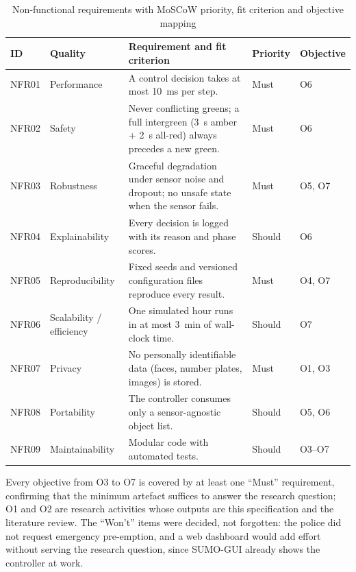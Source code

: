 \begin{table}[htbp]
\centering
\caption[Non-functional requirements with MoSCoW priority]{Non-functional requirements with MoSCoW priority, fit criterion and objective mapping}
\label{tab:srs-nfr}
\small
\renewcommand{\arraystretch}{1.1}
\begin{tabularx}{\textwidth}{@{}p{1.2cm}>{\raggedright\arraybackslash}p{2.5cm}>{\raggedright\arraybackslash}Xp{1.3cm}p{1.65cm}@{}}
\toprule
\textbf{ID} & \textbf{Quality} & \textbf{Requirement and fit criterion} & \textbf{Priority} & \textbf{Objective}\\
\midrule
NFR01 & Performance & A control decision takes at most 10~ms per step. & Must & O6\\
NFR02 & Safety & Never conflicting greens; a full intergreen (3~s amber + 2~s all-red) always precedes a new green. & Must & O6\\
NFR03 & Robustness & Graceful degradation under sensor noise and dropout; no unsafe state when the sensor fails. & Must & O5, O7\\
NFR04 & Explainability & Every decision is logged with its reason and phase scores. & Should & O6\\
NFR05 & Reproducibility & Fixed seeds and versioned configuration files reproduce every result. & Must & O4, O7\\
NFR06 & Scalability / efficiency & One simulated hour runs in at most 3~min of wall-clock time. & Should & O7\\
NFR07 & Privacy & No personally identifiable data (faces, number plates, images) is stored. & Must & O1, O3\\
NFR08 & Portability & The controller consumes only a sensor-agnostic object list. & Should & O5, O6\\
NFR09 & Maintainability & Modular code with automated tests. & Should & O3--O7\\
\bottomrule
\end{tabularx}
\end{table}

Every objective from O3 to O7 is covered by at least one ``Must'' requirement, confirming that the minimum artefact suffices to answer the research question; O1 and O2 are research activities whose outputs are this specification and the literature review. The ``Won't'' items were decided, not forgotten: the police did not request emergency pre-emption, and a web dashboard would add effort without serving the research question, since SUMO-GUI already shows the controller at work.

